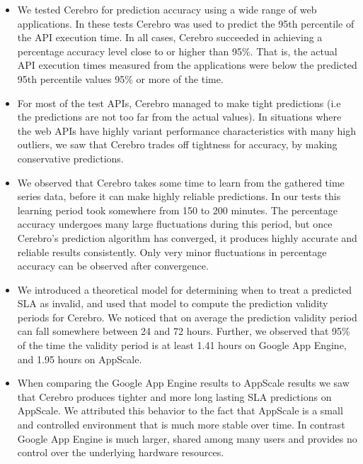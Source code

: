 \begin{itemize}
\item We tested Cerebro for prediction accuracy using a wide range of web applications. In these tests Cerebro was used to
predict the 95th percentile of the API execution time. In all cases, Cerebro succeeded in achieving a percentage
accuracy level close to or higher than 95\%. That is, the actual API execution times measured from the 
applications were below the predicted 95th percentile values 95\% or more of the time.
\item For most of the test APIs, Cerebro managed to make tight predictions (i.e the predictions are not too far
from the actual values). In situations where the web APIs have highly variant performance characteristics with many high outliers,
we saw that Cerebro trades off tightness for accuracy, by making conservative predictions.
\item We observed that Cerebro takes some time to learn from the gathered time series data, before it can make highly reliable
predictions. In our tests this learning period took somewhere from 150 to 200 minutes. The percentage accuracy undergoes
many large fluctuations during this period, but once Cerebro's prediction algorithm has converged, it produces highly
accurate and reliable results consistently. Only very minor fluctuations in percentage accuracy can be observed after
convergence.
\item We introduced a theoretical model for determining when to treat a predicted SLA as invalid, and used that model
to compute the prediction validity periods for Cerebro. We noticed that on average the prediction validity period
can fall somewhere between 24 and 72 hours. Further, we observed that 95\% of the time the validity period is at least 1.41 hours
on Google App Engine, and 1.95 hours on AppScale.
\item When comparing the Google App Engine results to AppScale results we saw that Cerebro produces tighter and
more long lasting SLA predictions on AppScale. We attributed this behavior to the fact that AppScale is a small and controlled
environment that is much more stable over time. In contrast Google App Engine is much larger, shared among many users
and provides no control over the underlying hardware resources.
\end{itemize}
